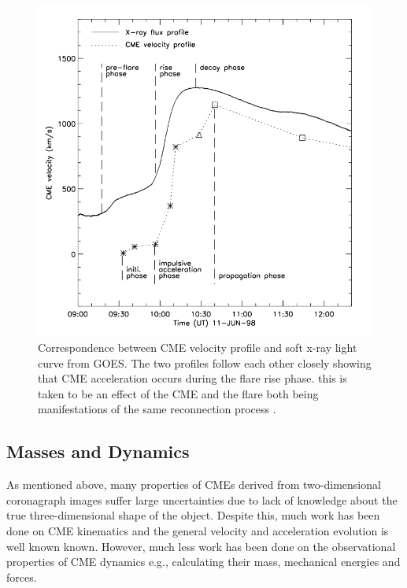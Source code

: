 \begin{figure}[t!]
\begin{center}
\includegraphics[scale=0.4, trim =0cm 1cm 0cm 1cm]{images/zhang2001}
\caption[CME speed profile along side flare X-ray light curve]{Correspondence between CME velocity profile and soft x-ray light curve from GOES. The two profiles follow each other closely showing that CME acceleration occurs during the flare rise phase. this is taken to be an effect of the CME and the flare both being manifestations of the same reconnection process \citet{zhang2001}.}
\label{fig:zhang2001}
\end{center}
\end{figure}

\subsection{Masses and Dynamics}

As mentioned above, many properties of CMEs derived from two-dimensional coronagraph images suffer large uncertainties due to lack of knowledge about the true three-dimensional shape of the object. Despite this, much work has been done on CME kinematics and the general velocity and acceleration evolution is well known known. However, much less work has been done on the observational properties of CME dynamics e.g., calculating their mass, mechanical energies and forces. 

